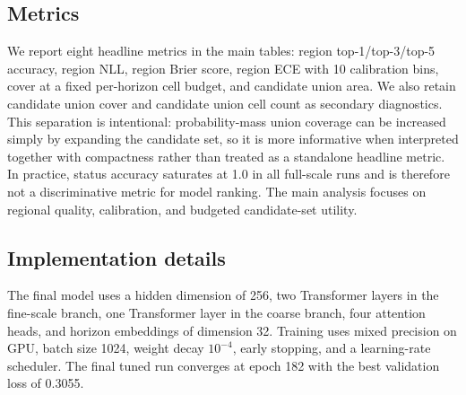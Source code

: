 \subsection{Metrics}

We report eight headline metrics in the main tables: region top-1/top-3/top-5 accuracy, region NLL, region Brier score, region ECE with 10 calibration bins, cover at a fixed per-horizon cell budget, and candidate union area. We also retain candidate union cover and candidate union cell count as secondary diagnostics. This separation is intentional: probability-mass union coverage can be increased simply by expanding the candidate set, so it is more informative when interpreted together with compactness rather than treated as a standalone headline metric. In practice, status accuracy saturates at 1.0 in all full-scale runs and is therefore not a discriminative metric for model ranking. The main analysis focuses on regional quality, calibration, and budgeted candidate-set utility.

\subsection{Implementation details}

The final model uses a hidden dimension of 256, two Transformer layers in the fine-scale branch, one Transformer layer in the coarse branch, four attention heads, and horizon embeddings of dimension 32. Training uses mixed precision on GPU, batch size 1024, weight decay $10^{-4}$, early stopping, and a learning-rate scheduler. The final tuned run converges at epoch 182 with the best validation loss of 0.3055.
